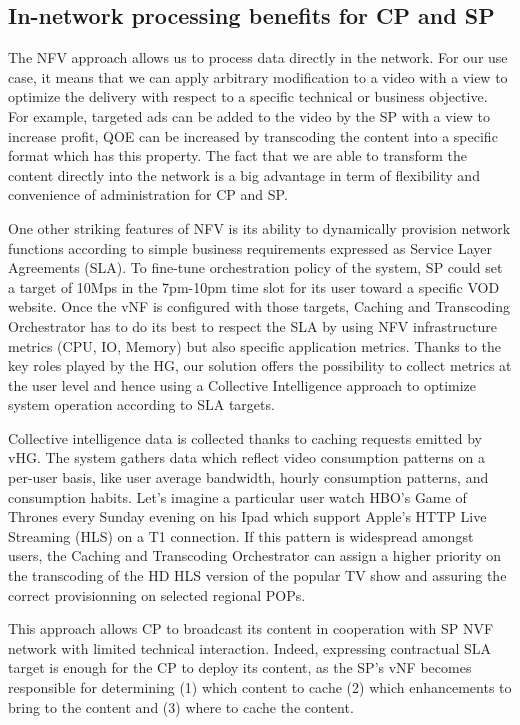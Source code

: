\subsection{In-network processing benefits for CP and SP}
The NFV approach allows us to process data directly in the network.
For our use case, it means that we can apply arbitrary modification to a video with a view to optimize the delivery with respect to a specific technical or business objective.
For example, targeted ads can be added to the video by the SP with a view to increase profit, QOE can be increased by transcoding the content into a specific format which has this property.
The fact that we are able to transform the content directly into the network is a big advantage in term of flexibility and convenience of administration for CP and SP.

One other striking features of NFV is its ability to dynamically provision network functions according to simple business requirements expressed as Service Layer Agreements (SLA).
To fine-tune orchestration policy of the system, SP could set a target of 10Mps in the 7pm-10pm time slot for its user toward a specific VOD website.
Once the vNF is configured with those targets, Caching and Transcoding Orchestrator has to do its best to respect the SLA by using NFV infrastructure metrics (CPU, IO, Memory) but also specific application metrics.
Thanks to the key roles played by the HG, our solution offers the possibility to collect metrics at the user level and hence using a Collective Intelligence approach to optimize system operation according to SLA targets. 

Collective intelligence data is collected thanks to caching requests emitted by vHG.
The system gathers data which reflect video consumption patterns on a per-user basis, like user average bandwidth, hourly consumption patterns, and consumption habits.
Let's imagine a particular user watch HBO's Game of Thrones every Sunday evening on his Ipad which support Apple's HTTP Live Streaming (HLS) on a T1 connection.
If this pattern is widespread amongst users, the Caching and Transcoding Orchestrator can assign a higher priority on the transcoding of the HD HLS version of the popular TV show and assuring the correct provisionning on selected regional POPs.

This approach allows CP to broadcast its content in cooperation with SP NVF network with limited technical interaction.
Indeed, expressing contractual SLA target is enough for the CP to deploy its content, as the SP's vNF becomes responsible for determining (1) which content to cache (2) which enhancements to bring to the content and (3) where to cache the content.
